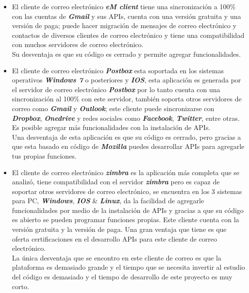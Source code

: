 \documentclass[12pt,oneside,onecolumn,openany]{report}
\begin{document}
\begin{itemize}
 \item El cliente de correo electrónico \textbf{\textit{eM client}} tiene una sincronización a 100\% con las cuentas de \textbf{\textit{Gmail}} y sus APIs, cuenta con una versión gratuita y una versión de paga; puede hacer migración de mensajes de correo electrónico y contactos de diversos clientes de correo electrónico y tiene una compatibilidad con muchos servidores de correo electrónico.\cite{em}\\Su desventaja es que su código es cerrado y permite agregar funcionalidades.
 \item El cliente de correo electrónico \textbf{\textit{Postbox}} esta soportada en los sistemas operativos \textbf{\textit{Windows 7}} o posteriores y \textbf{\textit{IOS}}, esta aplicación es generada por el servidor de correo electrónico \textbf{\textit{Postbox}} por lo tanto cuenta con una sincronización al 100\% con este servidor, también soporta otros servidores de correo como \textbf{\textit{Gmail}} y \textbf{\textit{Outlook}}; este cliente puede sincronizarse con \textbf{\textit{Dropbox}}, \textbf{\textit{Onedrive}} y redes sociales como \textbf{\textit{Facebook}}, \textbf{\textit{Twitter}}, entre otras. Es posible agregar más funcionalidades con la instalación de APIs.\\Una desventaja de esta aplicación es que su código es cerrado, pero gracias a que esta basado en código de \textbf{\textit{Mozilla}} puedes desarrollar APIs para agregarle tus propias funciones. \cite{box}
 \item El cliente de correo electrónico \textbf{\textit{zimbra}} es la aplicación más completa que se analizó, tiene compatibilidad con el servidor \textbf{\textit{zimbra}} pero es capaz de soportar otros servidores de correo electrónico, se encuentra en los 3 sistemas para PC, \textbf{\textit{Windows}}, \textbf{\textit{IOS}} \& \textbf{\textit{Linux}}, da la facilidad de agregarle funcionalidades por medio de la instalación de APIs y gracias a que su código es abierto se pueden programar funciones propias. Este cliente cuenta con la versión gratuita y la versión de paga. Una gran ventaja que tiene es que oferta certificaciones en el desarrollo APIs para este cliente de correo electrónico.\cite{zim}\\La única desventaja que se encontro en este cliente de correo es que la plataforma es demasiado grande y el tiempo que se necesita invertir al estudio del código es demasiado y el tiempo de desarrollo de este proyecto es muy corto.

\end{itemize}
\end{document}
